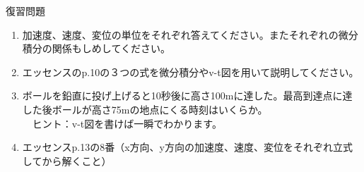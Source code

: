\documentclass[12pt,a4paper]{jsarticle}
\begin{document}
復習問題
\begin{enumerate}
    \item 加速度、速度、変位の単位をそれぞれ答えてください。またそれぞれの微分積分の関係もしめしてください。
    \item エッセンスのp.10の３つの式を微分積分やv-t図を用いて説明してください。
    \item ボールを鉛直に投げ上げると10秒後に高さ100mに達した。最高到達点に達した後ボールが高さ75mの地点にくる時刻はいくらか。
    \\　ヒント：v-t図を書けば一瞬でわかります。
    \item エッセンスp.13の8番（x方向、y方向の加速度、速度、変位をそれぞれ立式してから解くこと）
\end{enumerate}
\end{document}
